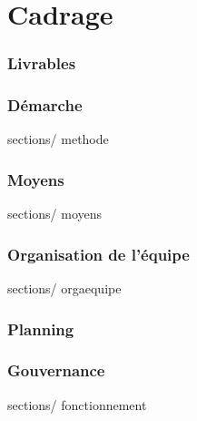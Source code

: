 \documentclass[french, 11pt, a4paper]{article}
\begin{document}
\newpage
\part {Cadrage}

\section {Livrables}

\section {Démarche}
 {sections/} {methode}

\section {Moyens}
 {sections/} {moyens}

\section {Organisation de l'équipe}
 {sections/} {orgaequipe}

\section {Planning}

\section {Gouvernance}
 {sections/} {fonctionnement}

\newpage
\end{document}
